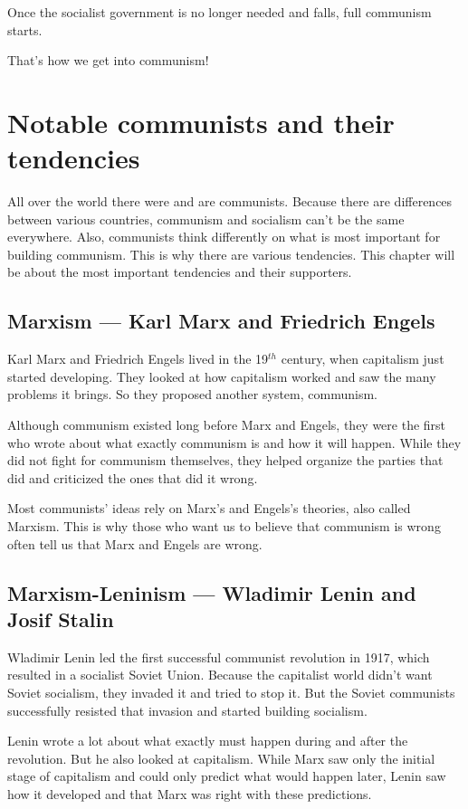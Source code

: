 \documentclass[a4paper]{book} %
\begin{document}
Once the socialist government is no longer needed and falls, full communism starts.

That's how we get into communism!

\chapter{Notable communists and their tendencies}

All over the world there were and are communists. Because there are differences between various countries, communism and socialism can't be the same everywhere. Also, communists think differently on what is most important for building communism. This is why there are various tendencies. This chapter will be about the most important tendencies and their supporters.

\section{Marxism --- Karl Marx and Friedrich Engels}

Karl Marx and Friedrich Engels lived in the 19$^{th}$ century, when capitalism just started developing. They looked at how capitalism worked and saw the many problems it brings. So they proposed another system, communism.

Although communism existed long before Marx and Engels, they were the first who wrote about what exactly communism is and how it will happen. While they did not fight for communism themselves, they helped organize the parties that did and criticized the ones that did it wrong.

Most communists' ideas rely on Marx's and Engels's theories, also called Marxism. This is why those who want us to believe that communism is wrong often tell us that Marx and Engels are wrong.

\section{Marxism-Leninism --- Wladimir Lenin and Josif Stalin}

Wladimir Lenin led the first successful communist revolution in 1917, which resulted in a socialist Soviet Union. Because the capitalist world didn't want Soviet socialism, they invaded it and tried to stop it. But the Soviet communists successfully resisted that invasion and started building socialism.

Lenin wrote a lot about what exactly must happen during and after the revolution. But he also looked at capitalism. While Marx saw only the initial stage of capitalism and could only predict what would happen later, Lenin saw how it developed and that Marx was right with these predictions.
\end{document}
